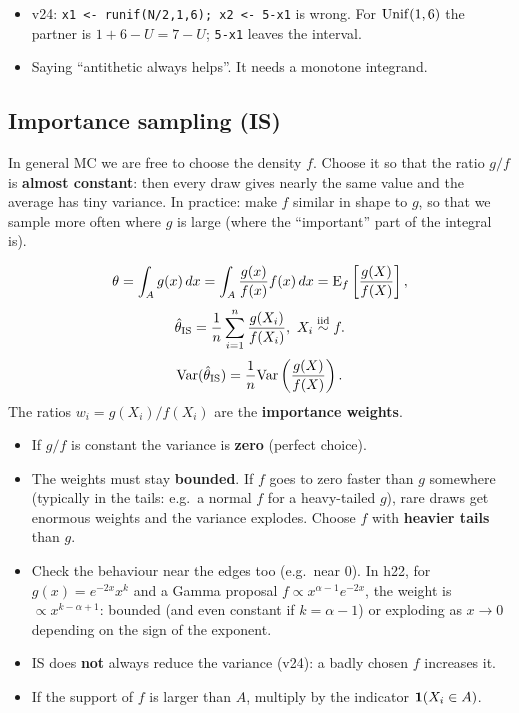 \begin{traps}
\begin{itemize}
  \item v24: \texttt{x1 <- runif(N/2,1,6); x2 <- 5-x1} is wrong. For $\mathrm{Unif}(1,6)$ the partner is $1+6-U = 7-U$; \texttt{5-x1} leaves the interval.
  \item Saying ``antithetic always helps''. It needs a monotone integrand.
\end{itemize}
\end{traps}

\subsection{Importance sampling (IS)}
\begin{idea}
In general MC we are free to choose the density $f$. Choose it so that the ratio $g/f$ is \textbf{almost constant}: then every draw gives nearly the same value and the average has tiny variance. In practice: make $f$ similar in shape to $g$, so that we sample more often where $g$ is large (where the ``important'' part of the integral is).
\end{idea}

\[
\theta = \int_A g(x)\,dx = \int_A\frac{g(x)}{f(x)}f(x)\,dx = \mathrm{E}_f\left[\frac{g(X)}{f(X)}\right],
\]
\[
\hat\theta_{\text{IS}} = \frac1n\sum_{i=1}^n\frac{g(X_i)}{f(X_i)},\ X_i\overset{\text{iid}}{\sim} f.
\]
\[
\mathrm{Var}(\hat\theta_{\text{IS}}) = \frac1n\mathrm{Var}\left(\frac{g(X)}{f(X)}\right).
\]
The ratios $w_i = g(X_i)/f(X_i)$ are the \textbf{importance weights}.
\begin{itemize}
  \item If $g/f$ is constant the variance is \textbf{zero} (perfect choice).
  \item The weights must stay \textbf{bounded}. If $f$ goes to zero faster than $g$ somewhere (typically in the tails: e.g.\ a normal $f$ for a heavy-tailed $g$), rare draws get enormous weights and the variance explodes. Choose $f$ with \textbf{heavier tails} than $g$.
  \item Check the behaviour near the edges too (e.g.\ near 0). In h22, for $g(x) = e^{-2x}x^{k}$ and a Gamma proposal $f\propto x^{\alpha-1}e^{-2x}$, the weight is $\propto x^{k-\alpha+1}$: bounded (and even constant if $k=\alpha-1$) or exploding as $x\to0$ depending on the sign of the exponent.
  \item IS does \textbf{not} always reduce the variance (v24): a badly chosen $f$ increases it.
  \item If the support of $f$ is larger than $A$, multiply by the indicator $\mathbf{1}(X_i\in A)$.
\end{itemize}

